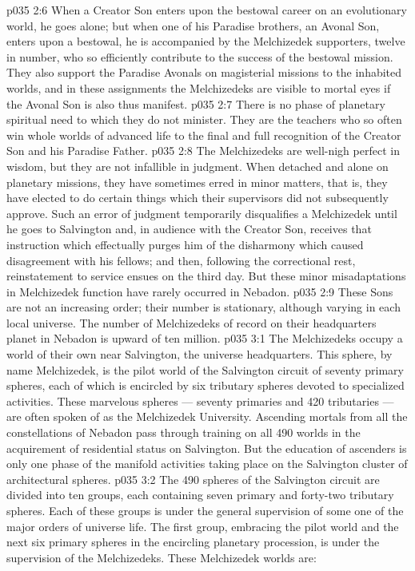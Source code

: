 \vs p035 2:6 When a Creator Son enters upon the bestowal career on an evolutionary world, he goes alone; but when one of his Paradise brothers, an Avonal Son, enters upon a bestowal, he is accompanied by the Melchizedek supporters, twelve in number, who so efficiently contribute to the success of the bestowal mission. They also support the Paradise Avonals on magisterial missions to the inhabited worlds, and in these assignments the Melchizedeks are visible to mortal eyes if the Avonal Son is also thus manifest.
\vs p035 2:7 There is no phase of planetary spiritual need to which they do not minister. They are the teachers who so often win whole worlds of advanced life to the final and full recognition of the Creator Son and his Paradise Father.
\vs p035 2:8 \pc The Melchizedeks are well\hyp{}nigh perfect in wisdom, but they are not infallible in judgment. When detached and alone on planetary missions, they have sometimes erred in minor matters, that is, they have elected to do certain things which their supervisors did not subsequently approve. Such an error of judgment temporarily disqualifies a Melchizedek until he goes to Salvington and, in audience with the Creator Son, receives that instruction which effectually purges him of the disharmony which caused disagreement with his fellows; and then, following the correctional rest, reinstatement to service ensues on the third day. But these minor misadaptations in Melchizedek function have rarely occurred in Nebadon.
\vs p035 2:9 These Sons are not an increasing order; their number is stationary, although varying in each local universe. The number of Melchizedeks of record on their headquarters planet in Nebadon is upward of ten million.
\vs p035 3:1 The Melchizedeks occupy a world of their own near Salvington, the universe headquarters. This sphere, by name Melchizedek, is the pilot world of the Salvington circuit of seventy primary spheres, each of which is encircled by six tributary spheres devoted to specialized activities. These marvelous spheres --- seventy primaries and 420 tributaries --- are often spoken of as the Melchizedek University. Ascending mortals from all the constellations of Nebadon pass through training on all 490 worlds in the acquirement of residential status on Salvington. But the education of ascenders is only one phase of the manifold activities taking place on the Salvington cluster of architectural spheres.
\vs p035 3:2 The 490 spheres of the Salvington circuit are divided into ten groups, each containing seven primary and forty\hyp{}two tributary spheres. Each of these groups is under the general supervision of some one of the major orders of universe life. The first group, embracing the pilot world and the next six primary spheres in the encircling planetary procession, is under the supervision of the Melchizedeks. These Melchizedek worlds are:
